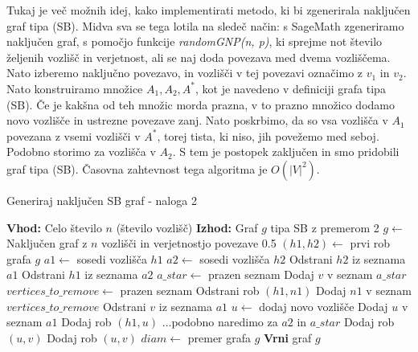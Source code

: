 \documentclass{article}
\begin{document}
Tukaj je več možnih idej, kako implementirati metodo, ki bi zgenerirala naključen graf tipa (SB). Midva sva se tega lotila na sledeč način: s SageMath zgeneriramo naključen graf, s pomočjo funkcije \textit{randomGNP(n, p)}, ki sprejme not število željenih vozlišč in verjetnost, ali se naj doda povezava med dvema vozliščema. Nato izberemo naključno povezavo, in vozlišči v tej povezavi označimo z $v_1$ in $v_2$. Nato konstruiramo množice $A_1, A_2, A^*$, kot je navedeno v definiciji grafa tipa (SB). Če je kakšna od teh množic morda prazna, v to prazno množico dodamo novo vozlišče in ustrezne povezave zanj. Nato poskrbimo, da so vsa vozlišča v $A_1$ povezana z vsemi vozlišči v $A^*$, torej tista, ki niso, jih povežemo med seboj. Podobno storimo za vozlišča v $A_2$. S tem je postopek zaključen in smo pridobili graf tipa (SB). Časovna zahtevnost tega algoritma je $O(|V|^2)$.


\begin{algorithm}
    \caption{Generiraj naključen SB graf - naloga 2}
    \begin{algorithmic}[1]
    \State \textbf{Vhod:} Celo število $n$ (število vozlišč)
    \State \textbf{Izhod:} Graf $g$ tipa SB z premerom 2
    \State $g \gets$ Naključen graf z $n$ vozlišči in verjetnostjo povezave 0.5
    \State $(h1, h2) \gets$ prvi rob grafa $g$
    \State $a1 \gets$ sosedi vozlišča $h1$
    \State $a2 \gets$ sosedi vozlišča $h2$
    \State Odstrani $h2$ iz seznama $a1$
    \State Odstrani $h1$ iz seznama $a2$
    \State $a\_star \gets$ prazen seznam
            \State Dodaj $v$ v seznam $a\_star$
        \EndIf
    \EndFor
    \State $vertices\_to\_remove \gets$ prazen seznam
                \State Odstrani rob $(h1, n1)$
                \State Dodaj $n1$ v seznam $vertices\_to\_remove$
            \EndIf
        \EndFor
    \EndFor
        \State Odstrani $v$ iz seznama $a1$
    \EndFor
        \State $u \gets$ dodaj novo vozlišče
        \State Dodaj $u$ v seznam $a1$
        \State Dodaj rob $(h1, u)$
    \EndIf
    \State ...podobno naredimo za $a2$ in $a\_star$
            \State Dodaj rob $(u, v)$
        \EndFor
    \EndFor
            \State Dodaj rob $(u, v)$
        \EndFor
    \EndFor
    \State $diam \gets$ premer grafa $g$
        \State \textbf{Vrni} graf $g$
    \EndIf
    \end{algorithmic}
    \end{algorithm}
    
\end{document}
